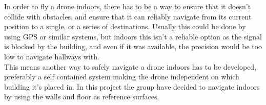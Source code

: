In order to fly a drone indoors, there has to be a way to ensure that it doesn't collide with obstacles, and ensure that it can reliably navigate from its current position to a single, or a series of destinations. Usually this could be done by using GPS or similar systems, but indoors this isn't a reliable option as the signal is blocked by the building, and even if it was available, the precision would be too low to navigate hallways with.\\
This means another way to safely navigate a drone indoors has to be developed, preferably a self contained system making the drone independent on which building it's placed in.
In this project the group have decided to navigate indoors by using the walls and floor as reference surfaces.